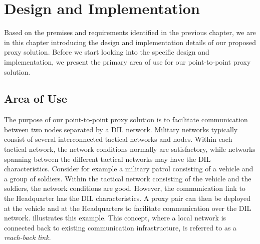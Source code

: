 \chapter{Design and Implementation}
\label{chapter:design}

Based on the premises and requirements identified in the previous chapter, we
are in this chapter introducing the design and implementation details of our
proposed proxy solution. Before we start looking into the specific design and
implementation, we present the primary area of use for our
point-to-point proxy solution.

\section{Area of Use}

 The purpose of our point-to-point proxy solution is to facilitate communication
 between two nodes separated by a DIL network. Military networks typically
 consist of several interconnected tactical networks and nodes.  Within each
 tactical network, the network conditions normally are satisfactory, while
 networks spanning between the different tactical networks may have the DIL
 characteristics. Consider for example a military patrol consisting of a vehicle
 and a group of soldiers. Within the tactical network consisting of the vehicle
 and the soldiers, the network conditions are good. However, the communication
 link to the Headquarter has the DIL characteristics. A proxy pair can then be
 deployed at the vehicle and at the Headquarters to facilitate communication
 over the DIL network.  illustrates this
 example. This concept, where a local network is connected back to existing
 communication infrastructure, is referred to as a \textit{reach-back link}.

